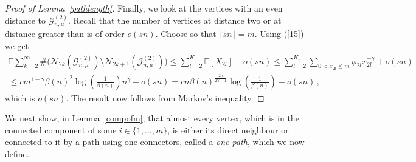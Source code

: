 \documentclass[12pt,a4paper]{article}
\numberwithin{equation}{section}
\begin{document}
\begin{proof}[Proof of Lemma~\ref{pathlength}]
 Finally, we look at the vertices with an even distance to $\mathcal G^{(2)}_{n,\mu}$. Recall that the number of vertices at distance two or at distance greater than  is of order $o(sn)$. %
 Choose  so that $\lfloor\tilde s n \rfloor= m$. Using 
 (\ref{15}) we get
\begin{align*}
    \mathbb E \sum_{k=2}^\infty \#\big(\mathcal{N}_{2k}(\mathcal G_{n,\mu}^{(2)})\setminus \mathcal{N}_{2k+1}(\mathcal G_{n,\mu}^{(2)})\big)\le   \sum_{l=2}^{K_\gamma} \mathbb{E}[X_{2l}] + o(sn) \le  \sum_{l=2}^{K_\gamma} \sum_{0<x_{2l}\le m} \phi_{2l} x_{2l}^{-\gamma} + o(sn)
    \\ \le  c m^{1-\gamma}\beta(n)^2 \log\left(\tfrac{1}{\beta(n)}\right) n ^\gamma + o(sn)= c n \beta(n)^{\tfrac{2\gamma}{2\gamma-1}}\log\left(\tfrac{1}{\beta(n)}\right)+o(sn)\,,
\end{align*}
which is $o(sn)$. 
The result now follows from Markov's inequality.
\end{proof}


We next show, in Lemma~\ref{compofm}, that
almost every vertex, which is in the connected component of some $i\in\{1,\ldots,m\}$, is either its direct neighbour or connected to it by a path using one-connectors, called a \emph{one-path}, which we now define.
\end{document}
